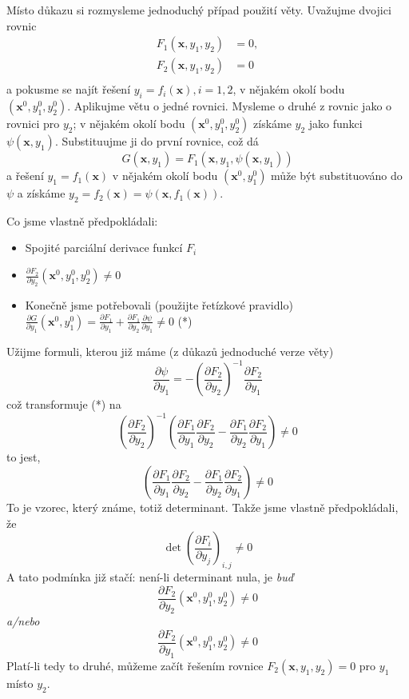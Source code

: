 \documentclass[../main.tex]{subfiles}
\begin{document}
\begin{intuition}
	Místo důkazu si rozmysleme jednoduchý případ použití věty. Uvažujme
	dvojici rovnic
	\begin{align*}
		F_1(\mathbf{x}, y_1, y_2) &= 0, \\
		F_2(\mathbf{x}, y_1, y_2) &= 0 \\
	\end{align*}
	a pokusme se najít řešení $y_i = f_i(\mathbf{x}), i = 1, 2$, v nějakém
	okolí bodu $(\mathbf{x}^0, y_1^0, y_2^0)$. Aplikujme větu o jedné
	rovnici. Mysleme o druhé z rovnic jako o rovnici pro $y_2$; v nějakém
	okolí bodu $(\mathbf{x}^0, y_1^0, y_2^0)$ získáme $y_2$ jako funkci
	$\psi(\mathbf{x}, y_1)$. Substituujme ji do první rovnice, což dá
	$$
	G(\mathbf{x}, y_1) = F_1(\mathbf{x}, y_1, \psi(\mathbf{x}, y_1))
	$$
	a řešení $y_1 = f_1(\mathbf{x})$ v nějakém okolí bodu $(\mathbf{x}^0,
	y_1^0)$ může být substituováno do $\psi$ a získáme $y_2 =
	f_2(\mathbf{x}) = \psi(\mathbf{x}, f_1(\mathbf{x}))$.

	Co jsme vlastně předpokládali:
	\begin{itemize}
		\item Spojité parciální derivace funkcí $F_i$
		\item $\frac{\partial F_2}{\partial y_2} (\mathbf{x}^0, y_1^0,
			y_2^0) \neq 0$
		\item Konečně jsme potřebovali (použijte řetízkové pravidlo)
			$\frac{\partial G}{\partial y_1} (\mathbf{x}^0, y_1^0)
			= \frac{\partial F_1}{\partial y_1} + \frac{\partial
			F_1}{\partial y_2} \frac{\partial \psi}{\partial y_1}
			\neq 0$ (*)
	\end{itemize}
	Užijme formuli, kterou již máme (z důkazů jednoduché verze věty)
	$$
	\frac{\partial \psi}{\partial y_1} = - \left ( \frac{\partial
	F_2}{\partial y_2} \right )^{-1} \frac{\partial F_2}{\partial y_1}
	$$
	což transformuje (*) na
	$$
	\left ( \frac{\partial F_2}{\partial y_2} \right )^{-1} \left (
	\frac{\partial F_1}{\partial y_1} \frac{\partial F_2}{\partial y_2} -
	\frac{\partial F_1}{\partial y_2} \frac{\partial F_2}{\partial y_1}
	\right ) \neq 0
	$$
	to jest,
	$$
	\left (
	\frac{\partial F_1}{\partial y_1} \frac{\partial F_2}{\partial y_2} -
	\frac{\partial F_1}{\partial y_2} \frac{\partial F_2}{\partial y_1}
	\right ) \neq 0
	$$
	To je vzorec, který známe, totiž determinant. Takže jsme vlastně
	předpokládali, že
	$$
	\det \left ( \frac{\partial F_i}{\partial y_j} \right )_{i,j} \neq 0
	$$
	A tato podmínka již stačí: není-li determinant nula, je \emph{buď}
	$$
	\frac{\partial F_2}{\partial y_2} (\mathbf{x}^0, y_1^0, y_2^0) \neq 0
	$$
	\emph{a/nebo}
	$$
	\frac{\partial F_2}{\partial y_1} (\mathbf{x}^0, y_1^0, y_2^0) \neq 0
	$$
	Platí-li tedy to druhé, můžeme začít řešením rovnice $F_2(\mathbf{x},
	y_1, y_2) = 0$ pro $y_1$ místo $y_2$.
\end{intuition}

\end{document}
